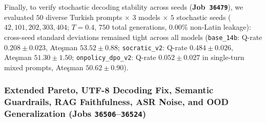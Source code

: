 \documentclass[a4paper,12pt]{report}
\begin{document}
Finally, to verify stochastic decoding stability across seeds (\textbf{Job~\texttt{36479}}), we evaluated $50$ diverse Turkish prompts $\times$ $3$ models $\times$ $5$ stochastic seeds ($42, 101, 202, 303, 404$; $T=0.4$, $750$ total generations, $0.00\%$ non-Latin leakage): cross-seed standard deviations remained tight across all models (\texttt{base\_14b}: Q-rate $0.208 \pm 0.023$, Ate\c{s}man $53.52 \pm 0.88$; \texttt{socratic\_v2}: Q-rate $0.484 \pm 0.026$, Ate\c{s}man $51.30 \pm 1.50$; \texttt{onpolicy\_dpo\_v2}: Q-rate $0.052 \pm 0.027$ in single-turn mixed prompts, Ate\c{s}man $50.62 \pm 0.90$).

\subsubsection{Extended Pareto, UTF-8 Decoding Fix, Semantic Guardrails, RAG Faithfulness, ASR Noise, and OOD Generalization (Jobs \texttt{36506}--\texttt{36524})}
\label{sec:exp25_36_suite}
\end{document}
